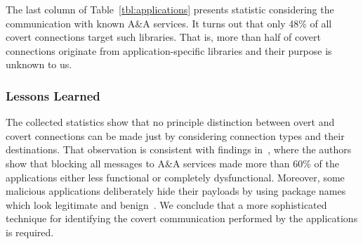 The last column of Table~\ref{tbl:applications} 
%
presents statistic considering the communication with known A\&A services. 
It turns out that only 48\% of all covert connections target such libraries. 
That is, more than half of covert connections originate from application-specific libraries and their purpose is unknown to us.



\subsubsection{Lessons Learned}
The collected statistics show that no principle distinction between overt and covert connections  
can be made just by considering connection types and their destinations. 
That observation is consistent with findings in~\cite{Hornyack:Han:Jung:Schechter:Wetherall:CCS11}, where the authors 
show that blocking all messages to A\&A services made more than 60\% of the applications either less functional or completely dysfunctional. 
Moreover, some malicious applications deliberately hide their payloads by using package names which look legitimate and benign~\cite{Zhou:Jiang:SP2012}. We conclude that a more sophisticated 
technique for identifying the covert communication performed by the applications is required. 

